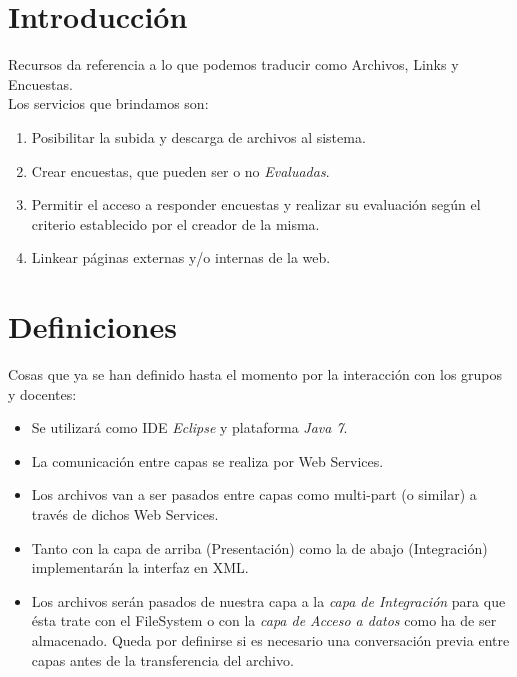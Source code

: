 \documentclass{article}
\begin{document}
\section{Introducci\'on}
Recursos da referencia a lo que podemos traducir como Archivos, Links y Encuestas.\\
Los servicios que brindamos son:
\begin{enumerate}
	\item Posibilitar la subida y descarga de archivos al sistema.
	\item Crear encuestas, que pueden ser o no \emph{Evaluadas}.
	\item Permitir el acceso a responder encuestas y realizar su evaluaci\'on seg\'un el criterio establecido por el creador de la misma.
	\item Linkear p\'aginas externas y/o internas de la web.
\end{enumerate}
\section{Definiciones}
\begin{description}
	\item Cosas que ya se han definido hasta el momento por la interacci\'on con los grupos y docentes:
	\renewcommand{\labelitemi}{\ding{85}} 
	\begin{itemize}
		\item Se utilizar\'a como IDE \emph{Eclipse} y plataforma \emph{Java 7}.
		\item La comunicaci\'on entre capas se realiza por Web Services.
		\item Los archivos van a ser pasados entre capas como multi-part (o similar) a trav\'es de dichos Web Services.
		\item Tanto con la capa de arriba (Presentaci\'on) como la de abajo (Integraci\'on) implementar\'an la interfaz en XML.
		\item Los archivos ser\'an pasados de nuestra capa a la  \emph{capa de Integraci\'on}  para que \'esta trate con el FileSystem o con la \emph{capa de Acceso a datos} como ha de ser almacenado. Queda por definirse si es necesario una conversaci\'on previa entre capas antes de la transferencia del archivo.

	\end{itemize}


\end{description}
\end{document}
